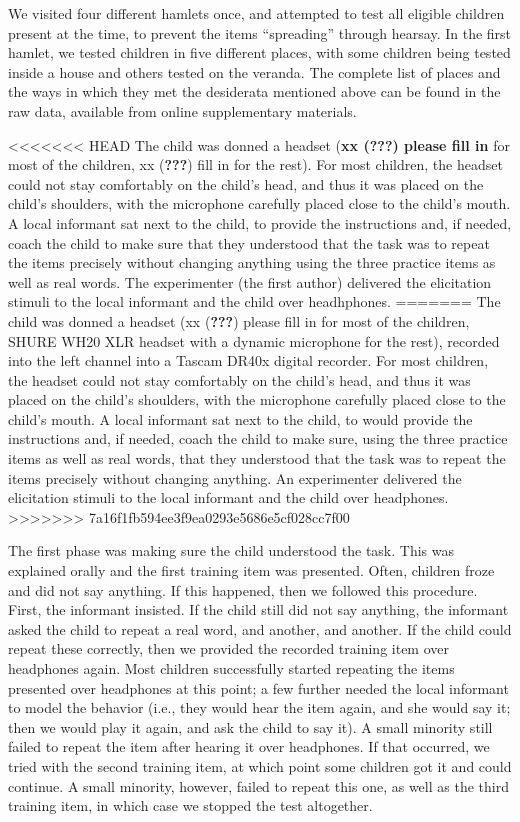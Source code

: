 \documentclass[english,,man,floatsintext]{apa6}
\begin{document}
We visited four different hamlets once, and attempted to test all eligible children present at the time, to prevent the items \enquote{spreading} through hearsay. In the first hamlet, we tested children in five different places, with some children being tested inside a house and others tested on the veranda. The complete list of places and the ways in which they met the desiderata mentioned above can be found in the raw data, available from online supplementary materials.

<<<<<<< HEAD
The child was donned a headset (\textbf{xx ({\textbf{???}}) please fill in} for most of the children, xx ({\textbf{???}}) fill in for the rest). For most children, the headset could not stay comfortably on the child's head, and thus it was placed on the child's shoulders, with the microphone carefully placed close to the child's mouth. A local informant sat next to the child, to provide the instructions and, if needed, coach the child to make sure that they understood that the task was to repeat the items precisely without changing anything using the three practice items as well as real words. The experimenter (the first author) delivered the elicitation stimuli to the local informant and the child over headhphones.
=======
The child was donned a headset (xx ({\textbf{???}}) please fill in for most of the children, SHURE WH20 XLR headset with a dynamic microphone for the rest), recorded into the left channel into a Tascam DR40x digital recorder. For most children, the headset could not stay comfortably on the child's head, and thus it was placed on the child's shoulders, with the microphone carefully placed close to the child's mouth. A local informant sat next to the child, to would provide the instructions and, if needed, coach the child to make sure, using the three practice items as well as real words, that they understood that the task was to repeat the items precisely without changing anything. An experimenter delivered the elicitation stimuli to the local informant and the child over headphones.
>>>>>>> 7a16f1fb594ee3f9ea0293e5686e5cf028cc7f00

The first phase was making sure the child understood the task. This was explained orally and the first training item was presented. Often, children froze and did not say anything. If this happened, then we followed this procedure. First, the informant insisted. If the child still did not say anything, the informant asked the child to repeat a real word, and another, and another. If the child could repeat these correctly, then we provided the recorded training item over headphones again. Most children successfully started repeating the items presented over headphones at this point; a few further needed the local informant to model the behavior (i.e., they would hear the item again, and she would say it; then we would play it again, and ask the child to say it). A small minority still failed to repeat the item after hearing it over headphones. If that occurred, we tried with the second training item, at which point some children got it and could continue. A small minority, however, failed to repeat this one, as well as the third training item, in which case we stopped the test altogether.
\end{document}
